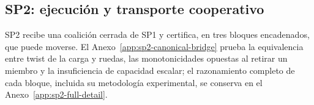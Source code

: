 \subsection{SP2: ejecución y transporte cooperativo}
\label{subsec:sp2}




SP2 recibe una coalición cerrada de SP1 y certifica, en tres bloques
encadenados, que puede moverse. El Anexo~\ref{app:sp2-canonical-bridge} prueba
la equivalencia entre twist de la carga y ruedas, las monotonicidades opuestas
al retirar un miembro y la insuficiencia de capacidad escalar; el razonamiento
completo de cada bloque, incluida su metodología experimental, se conserva en
el Anexo~\ref{app:sp2-full-detail}.

